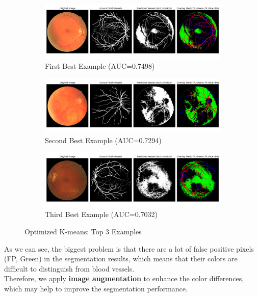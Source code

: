 \documentclass[12pt,letterpaper]{article}
\begin{document}
\begin{figure}[H]
    \centering
    \begin{subfigure}[H]{\textwidth}
        \centering
        \includegraphics[scale=0.35]{Figures/3 Optimized 1st.png}
        \vspace{-0.5cm}
        \caption{First Best Example (AUC=0.7498)}
        \label{fig:opt1}
    \end{subfigure}
    \begin{subfigure}[H]{\textwidth}
        \centering
        \includegraphics[scale=0.35]{Figures/3 Optimized 2nd.png}
        \vspace{-0.5cm}
        \caption{Second Best Example (AUC=0.7294)}
        \label{fig:opt2}
    \end{subfigure}
    \begin{subfigure}[H]{\textwidth}
        \centering
        \includegraphics[scale=0.35]{Figures/3 Optimized 3rd.png}
        \vspace{-0.5cm}
        \caption{Third Best Example (AUC=0.7032)}
        \label{fig:opt3}
    \end{subfigure}
    \caption{Optimized K-means: Top 3 Examples}
    \label{fig:opt}
\end{figure}
\noindent
As we can see, the biggest problem is that there are a lot of false positive pixels (FP, Green) in the segmentation results, which means that their colors are difficult to distinguish from blood vessels. \\
Therefore, we apply \textbf{image augmentation} to enhance the color differences, which may help to improve the segmentation performance. 
\end{document}
